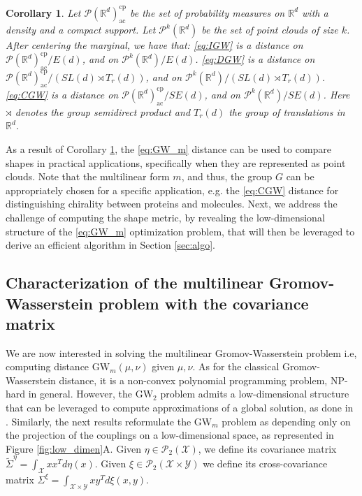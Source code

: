 \documentclass{article}
\newcommand{\R}{\mathbb{R}}
\newcommand{\Y}{\mathcal{Y}}
\newcommand{\X}{\mathcal{X}}
\newcommand{\1}{\mathbf{1}}
\newcommand{\GW}{\mathrm{GW}}
\renewcommand{\P}{\mathcal{P}}
\newtheorem{corollary}{Corollary}
\theoremstyle{definition}
\theoremstyle{remark}
\begin{document}
\begin{corollary}\label{coro:dist_shape}
    Let $\P(\R^d)_{\mathrm{ac}}^{\mathrm{cp}}$ be the set of probability measures on $\R^d$ with a density and a compact support. Let $\P^k(\R^d)$ be the set of point clouds of size $k$. After centering the marginal, we have that: \newline
        \indent\ref{eq:IGW} is a distance on $\P(\R^d)_{\mathrm{ac}}^{\mathrm{cp}}/E(d)$, and on $\P^k(\R^d)/E(d)$.\newline
        \indent \ref{eq:DGW} is a distance on $\P(\R^d)_{\mathrm{ac}}^{\mathrm{cp}}/(SL(d)\rtimes T_r(d))$, and on $\P^k(\R^d)/(SL(d)\rtimes T_r(d))$.\newline
        \indent \ref{eq:CGW} is a distance on $\P(\R^d)_{\mathrm{ac}}^{\mathrm{cp}}/SE(d)$, and on $\P^k(\R^d)/SE(d)$.\newline
    Here $\rtimes$ denotes the group semidirect product and $T_r(d)$ the group of translations in $\R^d$.
\end{corollary}

As a result of Corollary \ref{coro:dist_shape}, the \ref{eq:GW_m} distance can be used to compare shapes in practical applications, specifically when they are represented as point clouds. Note that the multilinear form $m$, and thus, the group $G$ can be appropriately chosen for a specific application, e.g. the \ref{eq:CGW} distance for distinguishing chirality between proteins and molecules. Next, we address the challenge of computing the shape metric,  
by revealing the low-dimensional structure of the \ref{eq:GW_m} optimization problem, that will then be leveraged to derive an efficient algorithm 
in Section \ref{sec:algo}.

\subsection{Characterization of the multilinear Gromov-Wasserstein problem with the covariance matrix}\label{sec:low_dim_carac}
We are now interested in solving the multilinear Gromov-Wasserstein problem i.e, computing distance $\GW_m(\mu,\nu)$ given $\mu,\nu$. As for the classical Gromov-Wasserstein distance, it is a non-convex polynomial programming problem, NP-hard in general. However, the $\GW_2$ problem admits a low-dimensional structure that can be leveraged to compute approximations of a global solution, as done in \cite{ryner2023globally}. Similarly, the next results reformulate the $\GW_m$ problem as  depending only on the projection of the couplings on a low-dimensional space, as represented in Figure \ref{fig:low_dimen}A. Given $\eta\in \P_2(\X)$, we define its covariance matrix $\tilde{\Sigma}^\eta = \int_{\X}xx^Td\eta(x)$. Given $\xi\in \P_2(\X\times\Y)$  we define its cross-covariance matrix $\Sigma^\xi=\int_{\X\times \Y}xy^Td\xi(x,y)$.
\end{document}
